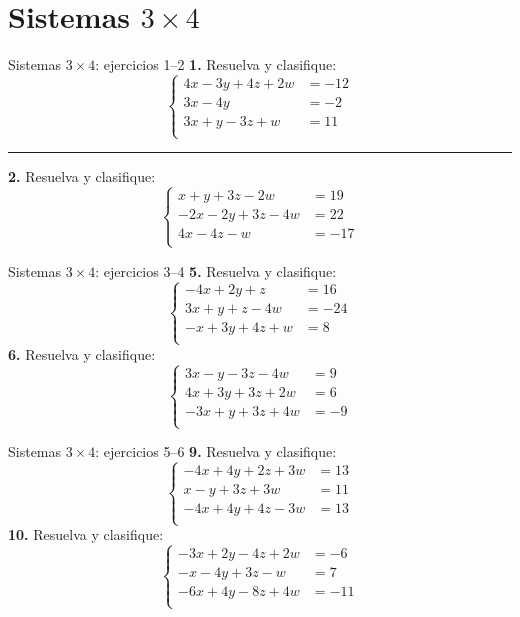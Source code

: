 \documentclass[aspectratio=169]{beamer}
\begin{document}
\section{Sistemas $3\times 4$}
\begin{frame}{Sistemas $3\times 4$: ejercicios 1--2}
\small
\textbf{1.} Resuelva y clasifique:
\[\left\{\begin{aligned}
4x-3y+4z+2w&=-12\\
3x-4y&=-2\\
3x+y-3z+w&=11\\
\end{aligned}\right.\]
\vspace{0.2em}\hrule\vspace{0.3em}
\textbf{2.} Resuelva y clasifique:
\[\left\{\begin{aligned}
x+y+3z-2w&=19\\
-2x-2y+3z-4w&=22\\
4x-4z-w&=-17\\
\end{aligned}\right.\]
\end{frame}
\begin{frame}{Sistemas $3\times 4$: ejercicios 3--4}
\small
\textbf{5.} Resuelva y clasifique:
\[\left\{\begin{aligned}
-4x+2y+z&=16\\
3x+y+z-4w&=-24\\
-x+3y+4z+w&=8\\
\end{aligned}\right.\]
\textbf{6.} Resuelva y clasifique:
\[\left\{\begin{aligned}
3x-y-3z-4w&=9\\
4x+3y+3z+2w&=6\\
-3x+y+3z+4w&=-9\\
\end{aligned}\right.\]
\end{frame}
\begin{frame}{Sistemas $3\times 4$: ejercicios 5--6}
\small
\textbf{9.} Resuelva y clasifique:
\[\left\{\begin{aligned}
-4x+4y+2z+3w&=13\\
x-y+3z+3w&=11\\
-4x+4y+4z-3w&=13\\
\end{aligned}\right.\]
\textbf{10.} Resuelva y clasifique:
\[\left\{\begin{aligned}
-3x+2y-4z+2w&=-6\\
-x-4y+3z-w&=7\\
-6x+4y-8z+4w&=-11\\
\end{aligned}\right.\]
\end{frame}
\end{document}
